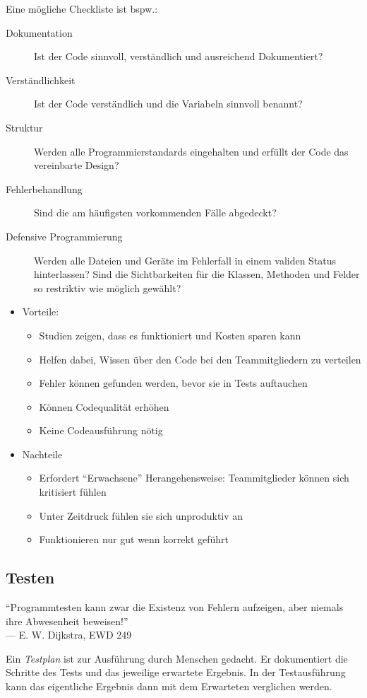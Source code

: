 \documentclass[
    ngerman,
    color=3b,
    summary,
    boxarc,
    main,
]{rubos-tuda-template}
\begin{document}
Eine mögliche Checkliste ist bspw.:
\begin{description}
    \item[Dokumentation] Ist der Code sinnvoll, verständlich und ausreichend Dokumentiert?
    \item[Verständlichkeit] Ist der Code verständlich und die Variabeln sinnvoll benannt?
    \item[Struktur] Werden alle Programmierstandards eingehalten und erfüllt der Code das vereinbarte Design?
    \item[Fehlerbehandlung] Sind die am häufigsten vorkommenden Fälle abgedeckt?
    \item[Defensive Programmierung] Werden alle Dateien und Geräte im Fehlerfall in einem validen Status hinterlassen? 
            Sind die Sichtbarkeiten für die Klassen, Methoden und Felder so restriktiv wie möglich gewählt?
\end{description}

\begin{itemize}
    \item Vorteile: \begin{itemize}
              \item Studien zeigen, dass es funktioniert und Kosten sparen kann
              \item Helfen dabei, Wissen über den Code bei den Teammitgliedern zu verteilen
              \item Fehler können gefunden werden, bevor sie in Tests auftauchen
              \item Können Codequalität erhöhen
              \item Keine Codeausführung nötig
          \end{itemize}
    \item Nachteile\begin{itemize}
              \item Erfordert \enquote{Erwachsene} Herangehensweise: Teammitglieder können sich kritisiert fühlen
              \item Unter Zeitdruck fühlen sie sich unproduktiv an
              \item Funktionieren nur gut wenn korrekt geführt
          \end{itemize}
\end{itemize}
\clearpage
\subsection{Testen}
\begin{defBox}
    \enquote{Programmtesten kann zwar die Existenz von Fehlern aufzeigen, aber niemals ihre Abwesenheit beweisen!}\mbox{}\\\mbox{}\hfill — E. W. Dijkstra, EWD 249
\end{defBox}
\begin{definition}[Testplan]
    Ein \textit{Testplan} ist zur Ausführung durch Menschen gedacht. Er dokumentiert die Schritte des Tests und das jeweilige erwartete Ergebnis. In der Testausführung kann das eigentliche Ergebnis dann mit dem Erwarteten verglichen werden.
\end{definition}
\end{document}
